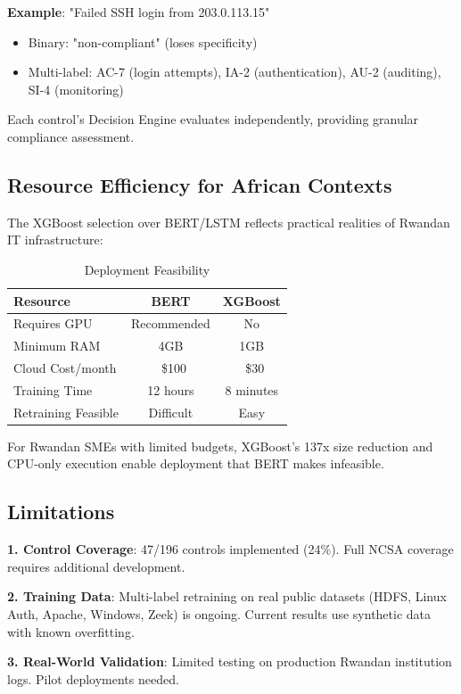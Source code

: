 \documentclass[11pt,conference]{IEEEtran}
\begin{document}
\textbf{Example}: "Failed SSH login from 203.0.113.15"
\begin{itemize}
    \item Binary: "non-compliant" (loses specificity)
    \item Multi-label: AC-7 (login attempts), IA-2 (authentication), AU-2 (auditing), SI-4 (monitoring)
\end{itemize}

Each control's Decision Engine evaluates independently, providing granular compliance assessment.

\subsection{Resource Efficiency for African Contexts}

The XGBoost selection over BERT/LSTM reflects practical realities of Rwandan IT infrastructure:

\begin{table}[h]
\centering
\caption{Deployment Feasibility}
\begin{tabular}{lcc}
\toprule
\textbf{Resource} & \textbf{BERT} & \textbf{XGBoost} \\
\midrule
Requires GPU & Recommended & No \\
Minimum RAM & 4GB & 1GB \\
Cloud Cost/month & ~\$100 & ~\$30 \\
Training Time & 12 hours & 8 minutes \\
Retraining Feasible & Difficult & Easy \\
\bottomrule
\end{tabular}
\end{table}

For Rwandan SMEs with limited budgets, XGBoost's 137x size reduction and CPU-only execution enable deployment that BERT makes infeasible.

\subsection{Limitations}

\textbf{1. Control Coverage}: 47/196 controls implemented (24\%). Full NCSA coverage requires additional development.

\textbf{2. Training Data}: Multi-label retraining on real public datasets (HDFS, Linux Auth, Apache, Windows, Zeek) is ongoing. Current results use synthetic data with known overfitting.

\textbf{3. Real-World Validation}: Limited testing on production Rwandan institution logs. Pilot deployments needed.
\end{document}
